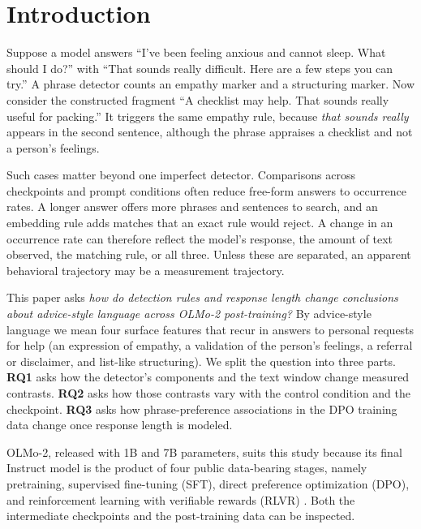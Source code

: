 \documentclass[11pt]{article}
\newif\ifpivot
\begin{document}
\section{Introduction}

Suppose a model answers ``I've been feeling anxious and cannot sleep. What
should I do?'' with ``That sounds really difficult. Here are a few steps you
can try.'' A phrase detector counts an empathy marker and a structuring
marker. Now consider the constructed fragment ``A checklist may help. That
sounds really useful for packing.'' It triggers the same empathy rule, because
\emph{that sounds really} appears in the second sentence, although the phrase
appraises a checklist and not a person's feelings.

Such cases matter beyond one imperfect detector. Comparisons across
checkpoints and prompt conditions often reduce free-form answers to occurrence
rates. A longer answer offers more phrases and sentences to search, and an
embedding rule adds matches that an exact rule would reject. A change in an
occurrence rate can therefore reflect the model's response, the amount of text
observed, the matching rule, or all three. Unless these are separated, an
apparent behavioral trajectory may be a measurement trajectory.

This paper asks \emph{how do detection rules and response length
change conclusions about advice-style language across OLMo-2 post-training?}
By advice-style language we mean four surface features that recur in answers
to personal requests for help (an expression of empathy, a validation of the
person's feelings, a referral or disclaimer, and list-like structuring).
We split the question into three parts. \textbf{RQ1} asks how the detector's components
and the text window change measured contrasts. \textbf{RQ2} asks how those
contrasts vary with the control condition and the checkpoint. \textbf{RQ3}
asks how phrase-preference associations in the DPO training data change once
response length is modeled.
\ifpivot
\textbf{RQ4} asks whether editing those preference pairs changes the
markers a retrained model produces, under a scoring rule that removes length
opportunity.
\fi

OLMo-2, released with 1B and 7B parameters, suits this study because its
final Instruct model is the product of
four public data-bearing stages, namely pretraining, supervised fine-tuning (SFT),
direct preference optimization (DPO), and reinforcement learning with
verifiable rewards (RLVR) \citep{olmo2025olmo2}. Both the intermediate
checkpoints and the post-training data can be inspected.
\end{document}
